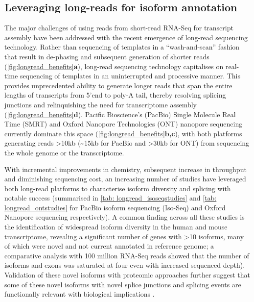 \subsection{Leveraging long-reads for isoform annotation}
The major challenges of using reads from short-read RNA-Seq for transcript assembly have been addressed with the recent emergence of long-read sequencing technology. Rather than sequencing of templates in a “wash-and-scan” fashion that result in de-phasing and subsequent generation of shorter reads (\cref{fig:longread_benefits}\textbf{a}), long-read sequencing technology capitalises on real-time sequencing of templates in an uninterrupted and processive manner. This provides unprecedented ability to generate longer reads that span the entire lengths of transcripts from 5'end to poly-A tail, thereby resolving splicing junctions and relinquishing the need for transcriptome assembly (\cref{fig:longread_benefits}\textbf{d}). Pacific Bioscience's (PacBio) Single Molecule Real Time (SMRT) and Oxford Nanopore Technologies (ONT) nanopore sequencing currently dominate this space (\cref{fig:longread_benefits}\textbf{b,c}), with both platforms generating reads >10kb (\textasciitilde15kb for PacBio and >30kb for ONT) from sequencing the whole genome or the transcriptome.  

With incremental improvements in chemistry, subsequent increase in throughput and diminishing sequencing cost, an increasing number of studies have leveraged both long-read platforms to characterise isoform diversity and splicing with notable success (summarised in \cref{tab: longread_isoseqstudies} and \cref{tab: longread_ontstudies} for PacBio isoform sequencing (Iso-Seq) and Oxford Nanopore sequencing respectively). A common finding across all these studies is the identification of widespread isoform diversity in the human \cite{Sharon2013, Au2013,Tseng2019,DeslattesMays2019} and mouse transcriptome, revealing a significant number of genes with >10 isoforms, many of which were novel and not current annotated in reference genome; a comparative analysis with 100 million RNA-Seq reads showed that the number of isoforms and exons was saturated at four even with increased sequenced depth\cite{DeslattesMays2019}). Validation of these novel isoforms with proteomic approaches further suggest that some of these novel isoforms with novel splice junctions and splicing events are functionally relevant with biological implications \cite{Huang2021}. 

